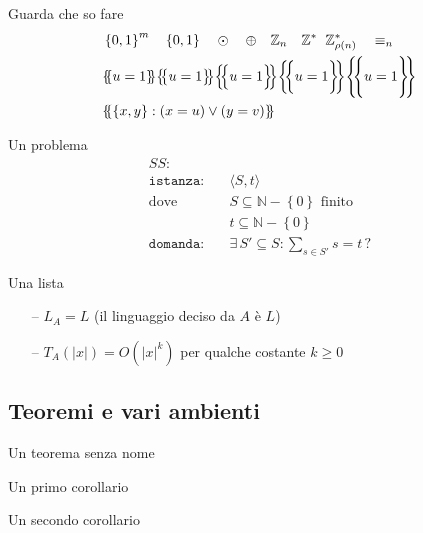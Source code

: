 Guarda che so fare
\begin{align*}
    &
    \setzo{m}
    \quad
    \setzo{}
    \quad
    \odot
    \quad
    \oplus
    \quad
    \zz{n}
    \quad
    \zs
    \quad
    \zs{\rho(n)}
    \quad
    \equiv_n
    \\
    &
    \ldblbrace
        u = 1
    \rdblbrace
    \ldblbraceb
        u = 1
    \rdblbraceb
    \ldblbraceB
        u = 1
    \rdblbraceB
    \ldblbracebb
        u = 1
    \rdblbracebb
    \ldblbraceBB
        u = 1
    \rdblbraceBB
    \\
    &
    \ldblbrace
        \left\{ x, y \right\}
        :
        \left( x = u \right)
        \vee
        \left( y = v \right)
    \rdblbrace
\end{align*}

Un problema
\begin{align*}
    SS: & \\
    \texttt{istanza:} \quad &
    \langle
        S,t
    \rangle
    \\
    \text{dove} \quad &
    S \subseteq \mathbb{N} - \left\{ 0 \right\} \text{ finito}
    \\
    &
    t \subseteq \mathbb{N} - \left\{ 0 \right\} \\
    \texttt{domanda:} \quad &
    \exists \, S' \subseteq S : \sum_{s \in S'}^{} s = t \, ?
\end{align*}

Una lista
\begin{itemize}[noitemsep,parsep=0pt,partopsep=0pt,topsep=0pt]
    \item[--] $L_A = L$ (il linguaggio deciso da $A$ è $L$)
    \item[--] $T_A(|x|) = O(|x|^k)$ per qualche costante $k \geq 0$
\end{itemize}

\subsection{Teoremi e vari ambienti }

\begin{theorem}
    Un teorema senza nome
\end{theorem}

\begin{corollario}
    Un primo corollario
\end{corollario}

\begin{corollario}
    Un secondo corollario
\end{corollario}

